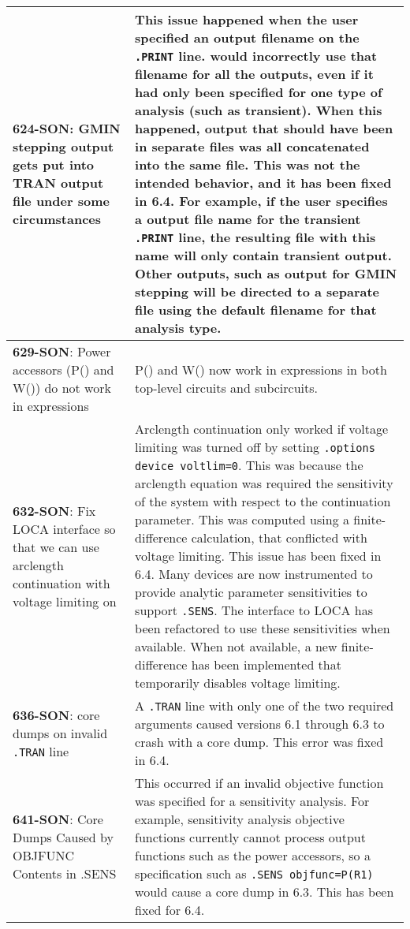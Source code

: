 {\begin{longtable}[h] {>{\raggedright\small}m{2in}|>{\raggedright\let\\\tabularnewline\small}m{3.5in}}
     \textbf{624-SON}: GMIN stepping output gets put into TRAN output file under 
     some circumstances  &  This issue happened when the user specified an 
     output filename on the \texttt{.PRINT} line.  \Xyce{} would incorrectly 
     use that filename for all the outputs, even if it had only been specified for 
     one type of analysis (such as transient).  When this happened, output that 
     should have been in separate files was all concatenated into the same file.  
     This was not the intended behavior, and it has been fixed in \Xyce{} 6.4.
     For example, if the user specifies a output file name for the transient 
     \texttt{.PRINT} line, the resulting file with this name will only contain 
     transient output.  Other outputs, such as output for GMIN stepping will 
     be directed to a separate file using the default filename for that analysis
     type.
     \\ \hline

     \textbf{629-SON}: Power accessors (P() and W()) do not work in expressions
     & P() and W() now work in expressions in both top-level circuits and
     subcircuits.
     \\ \hline

     \textbf{632-SON}: Fix LOCA interface so that we can use arclength 
     continuation with voltage limiting on & Arclength continuation only worked
     if voltage limiting was turned off by setting \texttt{.options device voltlim=0}.
     This was because the arclength equation was required the sensitivity 
     of the system with respect to the continuation parameter.  This was computed 
     using a finite-difference calculation, that conflicted with voltage limiting.
     This issue has been fixed in \Xyce{} 6.4.  Many devices are now instrumented
     to provide analytic parameter sensitivities to support \texttt{.SENS}.  The
     interface to LOCA has been refactored to use these sensitivities when available.
     When not available, a new finite-difference has been implemented that temporarily
     disables voltage limiting.  
     \\ \hline


     \textbf{636-SON}: \Xyce{} core dumps on invalid \texttt{.TRAN} line & A
     \texttt{.TRAN} line with only one of the two required arguments caused
     \Xyce{} versions 6.1 through 6.3 to crash with a core dump.  This error was
     fixed in \Xyce{} 6.4.  
     \\ \hline

     \textbf{641-SON}: Core Dumps Caused by OBJFUNC Contents in .SENS & This occurred
     if an invalid objective function was specified for a sensitivity analysis.  For 
     example, sensitivity analysis objective functions currently cannot process
     output functions such as the power accessors, so a specification such as
     \texttt{.SENS objfunc={P(R1)}}  would cause a core dump in \Xyce{} 6.3.  This
     has been fixed for \Xyce{} 6.4.
     \\ \hline


\end{longtable}}
